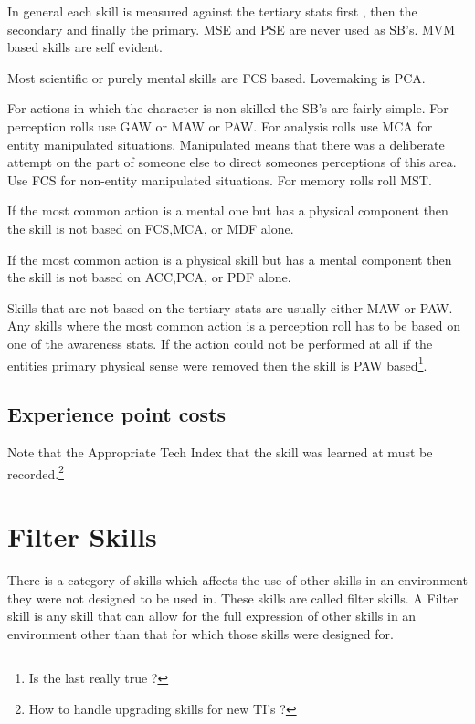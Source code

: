 In general each skill is measured against the tertiary stats first , then the 
secondary and finally the primary. MSE and PSE are never used as SB's.
MVM based skills are self evident. 

Most scientific or purely mental skills are FCS based.
Lovemaking is PCA.

For actions in which the character is non skilled the SB's are fairly
simple. For perception rolls use GAW or MAW or PAW. For analysis rolls
use MCA for entity manipulated situations. Manipulated means that there
was a deliberate attempt on the part of someone else to direct someones
perceptions of this area. Use FCS for non-entity manipulated
situations. For memory rolls roll MST. 

If the most common action is a mental one but has a physical component then
the skill is not based on FCS,MCA, or MDF alone.

If the most common action is a physical skill but has a mental component then the
skill is not based on ACC,PCA, or PDF alone.

Skills that are not based on the tertiary stats are usually either MAW
or PAW. Any skills where the most common action is a perception roll has
to be based on one of the awareness stats. If the action could not be
performed at all if the entities primary physical sense were removed
then the skill is PAW based\footnote{Is the last really true ?}. 



\subsection{Experience point costs}



Note that the Appropriate Tech Index that the skill was learned at 
must be recorded.\footnote{ How to handle upgrading skills for new TI's ?}

\section{Filter Skills}

There is a category of skills which affects the use of other skills 
in an environment they were not designed to be used in. These skills 
are called filter skills. A Filter skill is any skill that can allow 
for the full expression of other skills in an environment other than 
that for which those skills were designed for.

